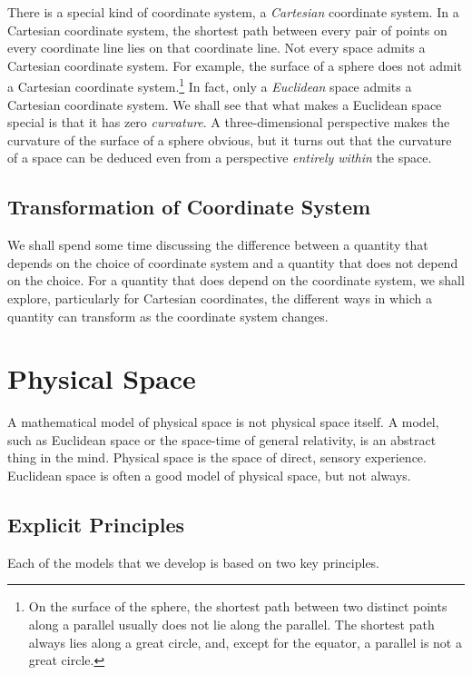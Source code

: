 There is a special kind of coordinate system, a \emph{Cartesian} coordinate
system.  In a Cartesian coordinate system, the shortest path between every pair
of points on every coordinate line lies on that coordinate line.  Not every
space admits a Cartesian coordinate system.  For example, the surface of a
sphere does not admit a Cartesian coordinate system.\footnote{%
   On the surface of the sphere, the shortest path between two distinct points
   along a parallel usually does not lie along the parallel.  The shortest path
   always lies along a great circle, and, except for the equator, a parallel is
   not a great circle.%
}
In fact, only a \emph{Euclidean} space admits a Cartesian coordinate system.
We shall see that what makes a Euclidean space special is that it has zero
\emph{curvature}.  A three-dimensional perspective makes the curvature of the
surface of a sphere obvious, but it turns out that the curvature of a space can
be deduced even from a perspective \emph{entirely within} the space.

\subsection{Transformation of Coordinate System}

We shall spend some time discussing the difference between a quantity that
depends on the choice of coordinate system and a quantity that does not depend
on the choice.  For a quantity that does depend on the coordinate system, we
shall explore, particularly for Cartesian coordinates, the different ways in
which a quantity can transform as the coordinate system changes.

\section{Physical Space}

A mathematical model of physical space is not physical space itself.  A model,
such as Euclidean space or the space-time of general relativity, is an abstract
thing in the mind.  Physical space is the space of direct, sensory experience.
Euclidean space is often a good model of physical space, but not always.

\subsection{Explicit Principles}

Each of the models that we develop is based on two key principles.

